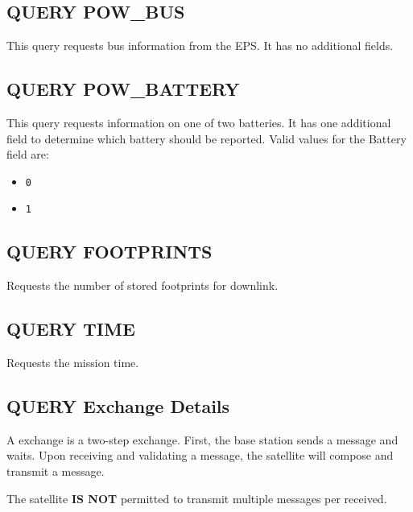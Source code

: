 \documentclass{article}
\begin{document}
    
  \subsection{QUERY POW\_BUS}
    This query requests bus information from the EPS. It has no additional fields.
    
    
  \subsection{QUERY POW\_BATTERY}
    This query requests information on one of two batteries. It has one additional field to determine which battery should be reported.
    Valid values for the Battery field are: 
    \begin{itemize}
    \item \texttt{0}
    \item \texttt{1}
    \end{itemize}
    
    
  \subsection{QUERY FOOTPRINTS}
    Requests the number of stored footprints for downlink.
    
    
  \subsection{QUERY TIME}
    Requests the mission time.
    
  
  \subsection{QUERY Exchange Details}
  A \mquery exchange is a two-step exchange. First, the base station sends a \mquery message and waits.
  Upon receiving and validating a \mquery message, the satellite will compose and transmit a \mresult message.
  
  The satellite \textbf{IS NOT} permitted to transmit multiple \mresult
   messages per \mquery received.
  
\end{document}
